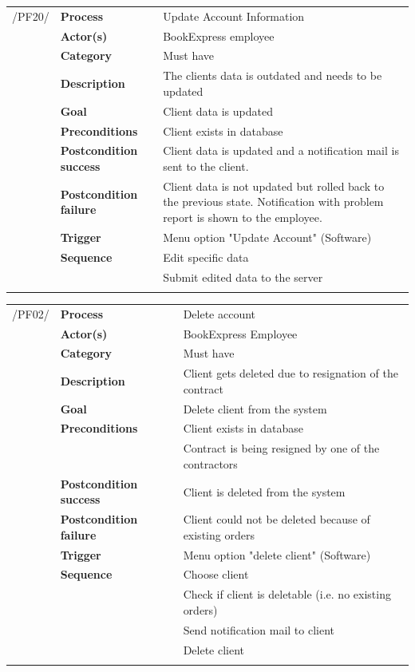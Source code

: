 \documentclass[11pt,a4paper,oneside,svgnames]{report}
\begin{document}
\noindent
\begin{tabular}{p{1.5cm}p{3cm}p{8cm}}
/PF20/	& \textbf{Process} & Update Account Information\\
		& \textbf{Actor(s)} & BookExpress employee\\
		& \textbf{Category} & Must have\\
		& \textbf{Description}	 & The clients data is outdated and needs to be updated\\
		& \textbf{Goal} & Client data is updated\\
		& \textbf{Preconditions} & Client exists in database\\
		& \textbf{Postcondition success} & Client data is updated and a notification mail is sent to the client.\\
		& \textbf{Postcondition failure} & Client data is not updated but rolled back to the previous state. Notification with problem report is shown to the employee.\\
		& \textbf{Trigger}	& Menu option "Update Account" (Software)\\
		& \textbf{Sequence}	& Edit specific data\\
		& & Submit edited data to the server\\
\hfill \\
\end{tabular}

\noindent
\begin{tabular}{p{1.5cm}p{3cm}p{8cm}}
/PF02/	& \textbf{Process} & Delete account\\ 
		& \textbf{Actor(s)} & BookExpress Employee\\ 
		& \textbf{Category} & Must have\\
		& \textbf{Description}	 & Client gets deleted due to resignation of the contract\\ 
		& \textbf{Goal} & Delete client from the system\\
		& \textbf{Preconditions} & Client exists in database\\
		& & Contract is being resigned by one of the contractors\\
		& \textbf{Postcondition success} & Client is deleted from the system\\
		& \textbf{Postcondition failure} & Client could not be deleted because of existing orders\\
		& \textbf{Trigger} & Menu option "delete client" (Software)\\
		& \textbf{Sequence} & Choose client\\
		& & Check if client is deletable (i.e. no existing orders)\\
		& & Send notification mail to client\\
		& & Delete client\\
\hfill \\		
\end{tabular}
\end{document}
